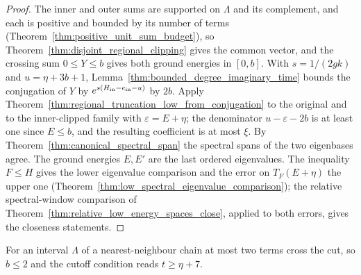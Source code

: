 \begin{proof}\leanok
    The inner and outer sums are supported on $\Lambda$ and its complement, and
    each is positive and bounded by its number of terms
    (Theorem~\ref{thm:positive_unit_sum_budget}), so
    Theorem~\ref{thm:disjoint_regional_clipping} gives the common vector, and the
    crossing sum $0\le Y\le b$ gives both ground energies in $[0,b]$. With
    $s=1/(2gk)$ and $u=\eta+3b+1$,
    Lemma~\ref{thm:bounded_degree_imaginary_time} bounds the conjugation of $Y$
    by $e^{s(H_{\rm in}-e_{\rm in}-u)}$ by $2b$. Apply
    Theorem~\ref{thm:regional_truncation_low_from_conjugation} to the original and
    to the inner-clipped family with $\varepsilon=E+\eta$; the denominator
    $u-\varepsilon-2b$ is at least one since $E\le b$, and the resulting
    coefficient is at most $\xi$. By Theorem~\ref{thm:canonical_spectral_span} the
    spectral spans of the two eigenbases agree. The ground energies $E,E'$ are the
    last ordered eigenvalues. The inequality $F\le H$ gives the lower eigenvalue
    comparison and the error on $T_F(E+\eta)$ the upper one
    (Theorem~\ref{thm:low_spectral_eigenvalue_comparison}); the relative
    spectral-window comparison of Theorem~\ref{thm:relative_low_energy_spaces_close},
    applied to both errors, gives the closeness statements.
\end{proof}

For an interval $\Lambda$ of a nearest-neighbour chain at most two terms cross the
cut, so $b\le2$ and the cutoff condition reads $t\ge\eta+7$.
